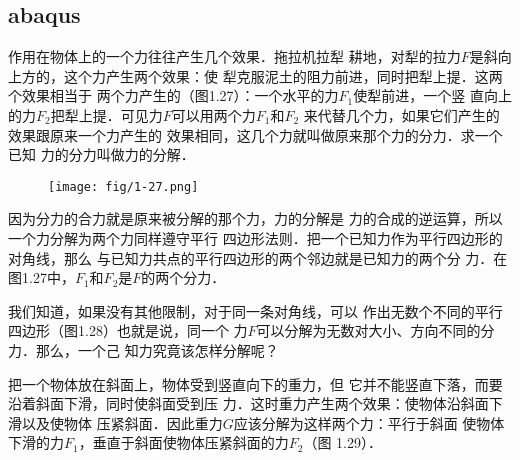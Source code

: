 \begin{Project}
\section[AAAAAAAAA]{abaqus}

作用在物体上的一个力往往产生几个效果．拖拉机拉犁
耕地，对犁的拉力$F$是斜向上方的，这个力产生两个效果：使
犁克服泥土的阻力前进，同时把犁上提．这两个效果相当于
两个力产生的（图1.27）：一个水平的力$F_1$使犁前进，一个竖
直向上的力$F_2$把犁上提．可见力$F$可以用两个力$F_1$和$F_2$
来代替几个力，如果它们产生的效果跟原来一个力产生的
效果相同，这几个力就叫做原来那个力的\textsf{分力}．求一个已知
力的分力叫做\textsf{力的分解}．

\begin{figure}[htp]\centering
\texttt{[image: fig/1-27.png]}
\caption{}
\end{figure}

    因为分力的合力就是原来被分解的那个力，力的分解是
力的合成的逆运算，所以一个力分解为两个力同样遵守平行
四边形法则．把一个已知力作为平行四边形的对角线，那么
与已知力共点的平行四边形的两个邻边就是已知力的两个分
力．在图1.27中，$F_1$和$F_2$是$F$的两个分力．


    我们知道，如果没有其他限制，对于同一条对角线，可以
作出无数个不同的平行四边形（图1.28）也就是说，同一个
力$F$可以分解为无数对大小、方向不同的分力．那么，一个己
知力究竟该怎样分解呢？

    把一个物体放在斜面上，物体受到竖直向下的重力，但
它并不能竖直下落，而要沿着斜面下滑，同时使斜面受到压
力．这时重力产生两个效果：使物体沿斜面下滑以及使物体
压紧斜面．因此重力$G$应该分解为这样两个力：平行于斜面
使物体下滑的力$F_1$，垂直于斜面使物体压紧斜面的力$F_2$（图
1.29）．


\begin{figure}[htp]
\centering
\begin{minipage}[t]{0.48\textwidth}
\centering
{}
\end{minipage}
\end{figure}
\end{Project}
